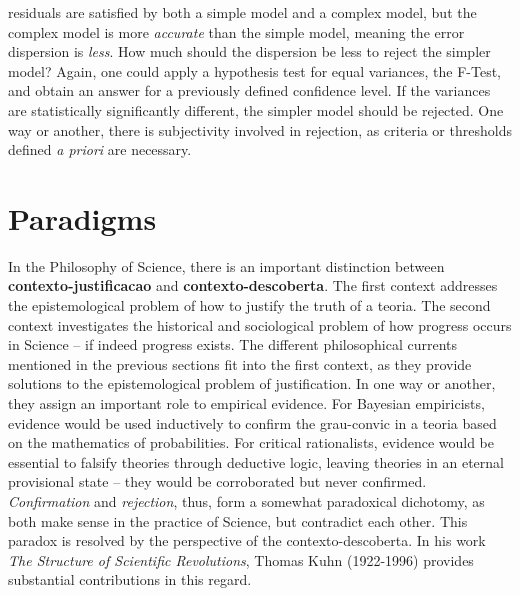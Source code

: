 \documentclass[./main_en.tex]{subfiles}
\begin{document}
residuals are satisfied by both a simple \gls{model} and a complex \gls{model}, but the complex \gls{model} is more \textit{accurate} than the simple \gls{model}, meaning the error dispersion is \textit{less}. How much should the dispersion be less to reject the simpler \gls{model}? Again, one could apply a hypothesis test for equal variances, the F-Test, and obtain an answer for a previously defined confidence level. If the variances are statistically significantly different, the simpler \gls{model} should be rejected. One way or another, there is subjectivity involved in rejection, as criteria or thresholds defined \textit{a priori} are necessary.

\section{Paradigms} \label{sec:epis:kuhn}

\par In the Philosophy of Science, there is an important distinction between \textbf{\gls{contexto-justificacao}} and \textbf{\gls{contexto-descoberta}}. The first context addresses the epistemological problem of how to justify the truth of a \gls{teoria}. The second context investigates the historical and sociological problem of how progress occurs in Science – if indeed progress exists. The different philosophical currents mentioned in the previous sections fit into the first context, as they provide solutions to the epistemological problem of justification. In one way or another, they assign an important role to empirical evidence. For Bayesian empiricists, evidence would be used inductively to confirm the \gls{grau-convic} in a \gls{teoria} based on the mathematics of probabilities. For critical rationalists, evidence would be essential to falsify theories through deductive logic, leaving theories in an eternal provisional state – they would be corroborated but never confirmed. \textit{Confirmation} and \textit{rejection}, thus, form a somewhat paradoxical dichotomy, as both make sense in the practice of Science, but contradict each other. This paradox is resolved by the perspective of the \gls{contexto-descoberta}. In his work \textit{The Structure of Scientific Revolutions}, Thomas Kuhn (1922-1996) provides substantial contributions in this regard.
\end{document}

